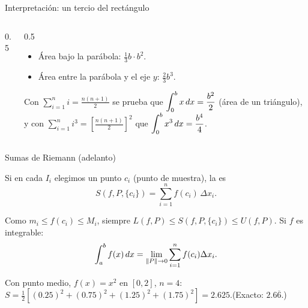 \documentclass[10pt,aspectratio=169]{beamer}
\begin{document}
\begin{frame}{Interpretación: un tercio del rectángulo}
  \begin{columns}
    \begin{column}{0.5\textwidth}
      \centering
    \end{column}
    \begin{column}{0.5\textwidth}
      \begin{itemize}
        \item Área bajo la parábola: $\tfrac13 b\cdot b^2$.
        \item Área entre la parábola y el eje $y$: $\tfrac23 b^3$.
      \end{itemize}
      \begin{ejemplo}[análogo]
        Con $\displaystyle\sum_{i=1}^n i=\frac{n(n+1)}{2}$ se prueba que
        $\displaystyle\int_0^b x\,dx=\frac{b^2}{2}$ (área de un triángulo), y con
        $\displaystyle\sum_{i=1}^n i^3=\left[\frac{n(n+1)}{2}\right]^2$ que
        $\displaystyle\int_0^b x^3\,dx=\frac{b^4}{4}$.
      \end{ejemplo}
    \end{column}
  \end{columns}
\end{frame}

\begin{frame}{Sumas de Riemann (adelanto)}
  \begin{definicion}
    Si en cada $I_i$ elegimos un punto $c_i$ (punto de muestra), la  es
    \[ S(f,P,\{c_i\})=\sum_{i=1}^n f(c_i)\,\Delta x_i. \]
  \end{definicion}
  Como $m_i\le f(c_i)\le M_i$, siempre $L(f,P)\le S(f,P,\{c_i\})\le U(f,P)$. Si $f$ es integrable:
  \[ \int_a^bf(x)\,dx=\lim_{\|P\|\to0}\sum_{i=1}^nf(c_i)\Delta x_i. \]
  \begin{ejemplo}
    Con punto medio, $f(x)=x^2$ en $[0,2]$, $n=4$: \
    $S=\tfrac12\left[(0.25)^2+(0.75)^2+(1.25)^2+(1.75)^2\right]=2.625$.\quad (Exacto: $2.6\overline{6}$.)
  \end{ejemplo}
\end{frame}
\end{document}
